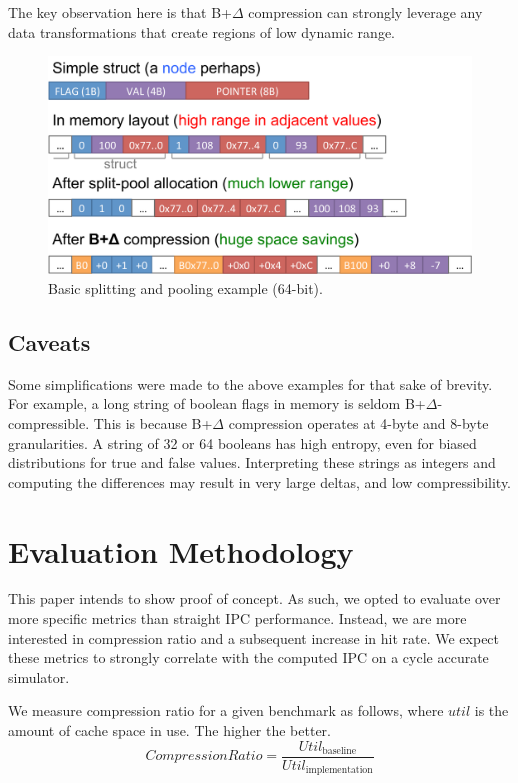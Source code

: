 \documentclass[pageno]{jpaper}
\begin{document}
The key observation here is that B+$\Delta$ compression  can strongly leverage any data transformations that create regions of low dynamic range.

\begin{figure}
  \captionsetup{justification=raggedright, singlelinecheck=false}
    \caption{Basic splitting and pooling example (64-bit).}
  \centering
    \includegraphics[scale=0.27]{mechanisms.pdf}
\end{figure}

\subsection{Caveats}
Some simplifications were made to the above examples for that sake of brevity. For example, a long string of boolean flags in memory is seldom B+$\Delta$-compressible. This is because B+$\Delta$ compression operates at 4-byte and 8-byte granularities. A string of 32 or 64 booleans has high entropy, even for biased distributions for true and false values. Interpreting these strings as integers and computing the differences may result in very large deltas, and low compressibility.


\section{Evaluation Methodology}
This paper intends to show proof of concept. As such, we opted to evaluate over more specific metrics than straight IPC performance. Instead, we are more interested in compression ratio and a subsequent increase in hit rate. We expect these metrics to strongly correlate with the computed IPC on a cycle accurate simulator.

We measure compression ratio for a given benchmark as follows, where $util$ is the amount of cache space in use. The higher the better.
\[
CompressionRatio = \frac{Util_{\text{baseline}}}{Util_{\text{implementation}}}
\]
\end{document}
